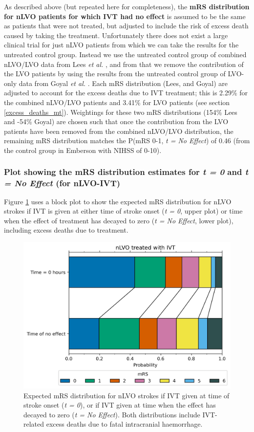 As described above (but repeated here for completeness), the \textbf{mRS distribution for nLVO patients for which IVT had no effect} is assumed to be the same as patients that were not treated, but adjusted to include the risk of excess death caused by taking the treatment. Unfortunately there does not exist a large clinical trial for just nLVO patients from which we can take the results for the untreated control group. Instead we use the untreated control group of combined nLVO/LVO data from Lees \textit{et al.} \cite{lees_time_2010}, and from that we remove the contribution of the LVO patients by using the results from the untreated control group of LVO-only data from Goyal \textit{et al.} \cite{goyal_endovascular_2016}. Each mRS distribution (Lees, and Goyal) are adjusted to account for the excess deaths due to IVT treatment; this is 2.29\% for the combined nLVO/LVO patients and 3.41\% for LVO patients (see section \ref{excess_deaths_mt}). Weightings for these two mRS distributions (154\% Lees and -54\% Goyal) are chosen such that once the contribution from the LVO patients have been removed from the combined nLVO/LVO distribution, the remaining mRS distribution matches the P(mRS 0-1, \textit{t = No Effect}) of 0.46 (from the control group in Emberson with NIHSS of 0-10).

\subsubsection{Plot showing the mRS distribution estimates for \textit{t = 0} and \textit{t = No Effect} (for nLVO-IVT)}

Figure \ref{fig:dist_bars_nLVO_treated_with_IVT} uses a block plot to show the expected mRS distribution for nLVO strokes if IVT is given at either time of stroke onset (\textit{t = 0}, upper plot) or time when the effect of treatment has decayed to zero (\textit{t = No Effect}, lower plot), including excess deaths due to treatment.

\begin{figure}[h]
    \centering
    \includegraphics[width=0.75\linewidth]{images/dist_bars_nLVO_treated_with_IVT}
    \caption{Expected mRS distribution for nLVO strokes if IVT given at time of stroke onset (\textit{t = 0}), or if IVT given at time when the effect has decayed to zero (\textit{t = No Effect}). Both distributions include IVT-related excess deaths due to fatal intracranial haemorrhage.}
    \label{fig:dist_bars_nLVO_treated_with_IVT}
\end{figure}

